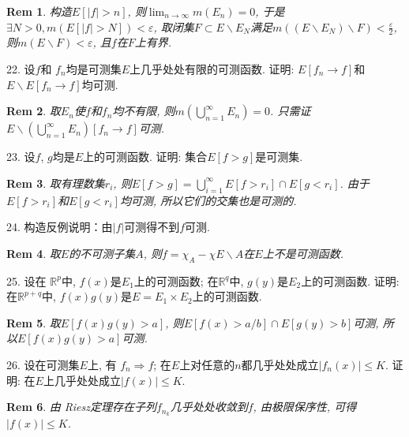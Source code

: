 \documentclass[UTF8]{article}
\newtheorem*{remark}{Rem}
\begin{document}
    \begin{remark}
        构造$E\left[|f|>n\right]$, 则$\lim_{n \to \infty}m(E_n)=0$, 于是$\exists N>0, m(E\left[|f|>N\right])<\varepsilon$, 取闭集$F\subset E\backslash E_N$满足$m\left(\left(E\backslash E_N\right)\backslash F\right)< \frac{\varepsilon}{2}$, 则$m(E\backslash F)<\varepsilon$, 且$f$在$F$上有界.\par
    \end{remark}
    22. 设$f$和 $f_n$均是可测集$E$上几乎处处有限的可测函数. 证明: $E\left[f_n\rightarrow f\right]$和$E\backslash E\left[f_n\rightarrow f\right]$均可测.\par
    \begin{remark}
        取$E_n$使$f$和$f_n$均不有限, 则$m(\bigcup_{n=1}^{\infty}E_n)=0$. 只需证$E\backslash \left(\bigcup_{n=1}^{\infty}E_n\right)\left[f_n\rightarrow f\right]$可测.\par
    \end{remark}
    23. 设$f$, $g$均是$E$上的可测函数. 证明: 集合$E\left[f>g\right]$是可测集.\par
    \begin{remark}
        取有理数集$r_i$, 则$E\left[f>g\right]=\bigcup_{i=1}^{\infty}E\left[f>r_i\right]\cap E\left[g<r_i\right]$. 由于$E\left[f>r_i\right]$和$E\left[g<r_i\right]$均可测, 所以它们的交集也是可测的.\par
    \end{remark}
    24. 构造反例说明：由$|f|$可测得不到$f$可测.\par
    \begin{remark}
        取$E$的不可测子集$A$, 则$f=\chi_{A}-\chi{E\backslash A}$在$E$上不是可测函数.\par
    \end{remark}
    25. 设在 $\mathbb{R}^p$中, $f(x)$是$E_1$上的可测函数; 在$\mathbb{R}^q$中, $g(y)$是$E_2$上的可测函数. 证明: 在$\mathbb{R}^{p+q}$中, $f(x)g(y)$是$E=E_1\times E_2$上的可测函数.\par
    \begin{remark}
        取$E\left[f(x)g(y)>a\right]$, 则$E\left[f(x)>a/b\right]\cap E\left[g(y)>b\right]$可测, 所以$E\left[f(x)g(y)>a\right]$可测.\par
    \end{remark}
    26. 设在可测集$E$上, 有 $f_n \Rightarrow f$; 在$E$上对任意的$n$都几乎处处成立$|f_n(x)|\leqslant K$. 证明: 在$E$上几乎处处成立$|f(x)|\leqslant K$.\par
    \begin{remark}
        由 Riesz定理存在子列$f_{n_k}$几乎处处收敛到$f$, 由极限保序性, 可得$|f(x)|\leqslant K$.\par
    \end{remark}
\end{document}

